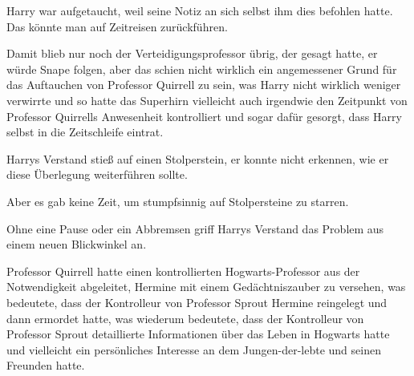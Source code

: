 Harry war aufgetaucht, weil seine Notiz an sich selbst ihm dies befohlen hatte.
Das könnte man auf Zeitreisen zurückführen.

Damit blieb nur noch der Verteidigungsprofessor übrig, der gesagt hatte, er würde Snape folgen, aber das schien nicht wirklich ein angemessener Grund für das Auftauchen von Professor Quirrell zu sein, was Harry nicht wirklich weniger verwirrte und so hatte das Superhirn vielleicht auch irgendwie den Zeitpunkt von Professor Quirrells Anwesenheit kontrolliert und sogar dafür gesorgt, dass Harry selbst in die Zeitschleife eintrat.

Harrys Verstand stieß auf einen Stolperstein, er konnte nicht erkennen, wie er diese Überlegung weiterführen sollte.

Aber es gab keine Zeit, um stumpfsinnig auf Stolpersteine zu starren.

Ohne eine Pause oder ein Abbremsen griff Harrys Verstand das Problem aus einem neuen Blickwinkel an.

Professor Quirrell hatte einen kontrollierten Hogwarts-Professor aus der Notwendigkeit abgeleitet, Hermine mit einem Gedächtniszauber zu versehen, was bedeutete, dass der Kontrolleur von Professor Sprout Hermine reingelegt und dann ermordet hatte, was wiederum bedeutete, dass der Kontrolleur von Professor Sprout detaillierte Informationen über das Leben in Hogwarts hatte und vielleicht ein persönliches Interesse an dem Jungen-der-lebte und seinen Freunden hatte.

